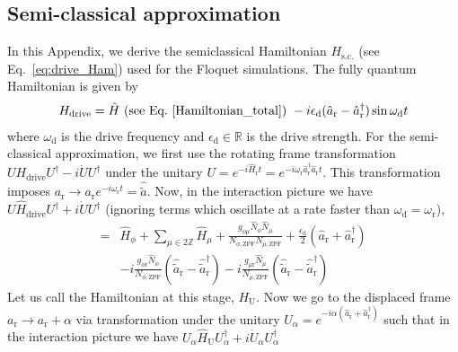 \documentclass[%
reprint,
superscriptaddress,
 amsmath,amssymb,
 aps,
 prx,
longbibliography,
floatfix,
]{revtex4-2}
\begin{document}
\subsection{Semi-classical approximation}\label{app:semi-classical}
In this Appendix, we derive the semiclassical Hamiltonian $H_\textrm{s.c.}$ (see Eq.~\ref{eq:drive_Ham}) used for the Floquet simulations. The fully quantum Hamiltonian is given by 
\begin{align}
    H_\textrm{drive}=\hat H \textrm{ (see Eq.~\ref{Hamiltonian_total}) }-i\epsilon_\textrm{d}(\hat a_\textrm{r}-\hat a_\textrm{r}^\dagger)\sin{\omega_\textrm{d} t}
\end{align}
where $\omega_\textrm{d}$ is the drive frequency and $\epsilon_\textrm{d}\in \mathbb{R}$ is the drive strength. For the semi-classical approximation, we first use the rotating frame transformation $UH_\textrm{drive}U^\dagger-i\dot{U}U^\dagger$ under the unitary $U=e^{-i\hat H_\textrm{r}t}=e^{-i\omega_\textrm{r} \hat a_\textrm{r}^\dagger \hat a_\textrm{r}t}$. This transformation imposes $a_\textrm{r}\rightarrow a_\textrm{r}e^{-i\omega_\textrm{r}t}=\hat{\tilde{a}}$. Now, in the interaction picture we have $U\hat H_\textrm{drive}U^\dagger+i\dot{U}U^\dagger$ (ignoring terms which oscillate at a rate faster than $\omega_\textrm{d}=\omega_\textrm{r}$),
\begin{align}
   =&\hat H_\phi+\sum_{\mu\in 2\mathbb{Z}}\hat H_\mu+\frac{g_{\phi\mu}\hat N_\phi\hat N_\mu}{N_{\phi,\textrm{ZPF}}N_{\mu,\textrm{ZPF}}}+\frac{\epsilon_\textrm{d}}{2}(\hat a_\textrm{r}+\hat a_\textrm{r}^\dagger)\nonumber\\ 
   &-i\frac{g_{\phi\textrm{r}}\hat N_\phi}{N_{\phi,\textrm{ZPF}}}(\hat {\tilde{a}}_\textrm{r}-\hat {\tilde{a}}_\textrm{r}^\dagger)-i\frac{g_{\mu\textrm{r}}\hat N_\mu}{N_{\mu,\textrm{ZPF}}}(\hat {\tilde{a}}_\textrm{r}-\hat {\tilde{a}}_\textrm{r}^\dagger)
\end{align}
Let us call the Hamiltonian at this stage, $H_\textrm{U}$. Now we go to the displaced frame $a_\textrm{r}\rightarrow a_\textrm{r}+\alpha$ via transformation under the unitary $U_\alpha=e^{-i\alpha(\hat a_\textrm{r}+\hat a_\textrm{r}^\dagger)}$ such that in the interaction picture we have $ U_\alpha\hat H_\textrm{U}U_\alpha^\dagger+i\dot{U}_\alpha U_\alpha^\dagger$ 
\end{document}
